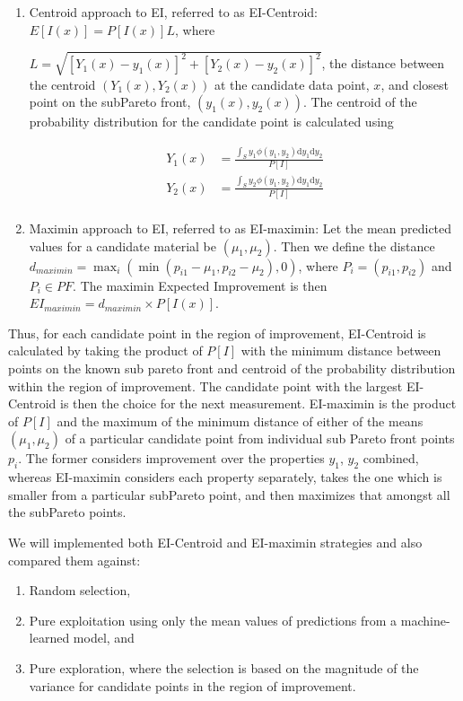 \documentclass[12pt]{article}
\begin{document}
\begin{enumerate}[label=(\alph*)]
		\item  Centroid approach to EI, referred to as EI-Centroid: $E[I(x)] = P[I(x)]L$, where

		$L=\sqrt{[Y_1(x)-y_1(x)]^2+[Y_2(x)-y_2(x)]^2}$, the distance between the centroid $(Y_1(x), Y_2(x))$ at the candidate
		data point, $x$, and closest point on the subPareto front, $(y_1(x), y_2(x))$.
		The centroid of the probability distribution for the candidate point is calculated using

		\begin{align*}
			Y_1(x)&=\frac{\int_S y_1\phi(y_1, y_2)\mathrm{d}y_1\mathrm{d}y_2}{P[I]}\\
			Y_2(x)&=\frac{\int_S y_2\phi(y_1, y_2)\mathrm{d}y_1\mathrm{d}y_2}{P[I]}\\
		\end{align*}


	\item Maximin approach to EI, referred to as EI-maximin:
	Let the mean predicted values for a candidate material be $(\mu_1, \mu_2)$.
	Then we define the distance $d_{maximin} = \max_i(\min(p_{i1}-\mu_1, p_{i2}-\mu_2), 0)$, where $P_i=(p_{i1}, p_{i2})$ and $P_i \in PF$.
	The maximin Expected Improvement is then $EI_{maximin}=d_{maximin} \times P[I(x)]$.

\end{enumerate}

	Thus, for each candidate point in the region of improvement,
	EI-Centroid is calculated by taking the product of $P[I]$ with the minimum distance between
	points on the known sub pareto front and centroid of the probability distribution within the region of improvement.
	The candidate point with the largest EI-Centroid is then the choice for the next measurement.
	EI-maximin is the product of $P[I]$ and the maximum of the minimum distance of either of the means $(\mu_1, \mu_2)$
	of a particular candidate point from individual sub Pareto front points $p_i$.
	The former considers improvement over the properties $y_1$, $y_2$ combined,
	whereas EI-maximin considers each property separately, takes the one which is smaller from a particular subPareto point,
	and then maximizes that amongst all the subPareto points.

	We will implemented both EI-Centroid and EI-maximin strategies and also compared them against:

\begin{enumerate}[label=(\roman*)]
		\item  Random selection,
		\item  Pure exploitation using only the mean values of predictions from a machine-learned model, and
		\item  Pure exploration, where the  selection is based on the magnitude of the variance for candidate points in the region of improvement.
\end{enumerate}
\end{document}
